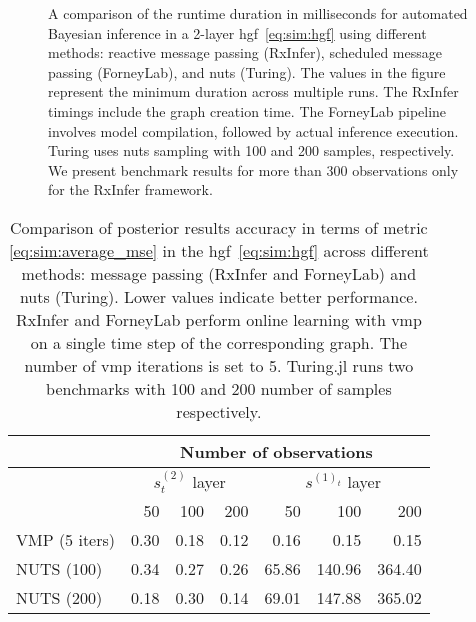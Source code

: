 \begin{figure}
  \centering
  \caption{A comparison of the runtime duration in milliseconds for automated Bayesian inference in a 2-layer \ac{hgf}~\eqref{eq:sim:hgf} using different methods: reactive message passing (RxInfer), scheduled message passing (ForneyLab), and \ac{nuts} (Turing).
    The values in the figure represent the minimum duration across multiple runs.
    The RxInfer timings include the graph creation time.
    The ForneyLab pipeline involves model compilation, followed by actual inference execution.
    Turing uses \ac{nuts} sampling with 100 and 200 samples, respectively.
    We present benchmark results for more than $300$ observations only for the RxInfer framework.
  }
  \label{fig:sim:hgf_performance_comparison}
\end{figure}

\begin{table}[t]
  \centering
  \begin{tabular}{ |l||r|r|r|r|r|r| }
    \hline
                  & \multicolumn{6}{|c|}{Number of observations}                                                                            \\
    \hline
                  & \multicolumn{3}{|c|}{$s^{(2)}_t$ layer}      & \multicolumn{3}{|c|}{$s^{(1)_t}$ layer}                                  \\
    \hline
                  & 50                                           & 100                                     & 200  & 50    & 100    & 200    \\
    \hline
    VMP (5 iters) & 0.30                                         & 0.18                                    & 0.12 & 0.16  & 0.15   & 0.15   \\
    \hline
    NUTS (100)    & 0.34                                         & 0.27                                    & 0.26 & 65.86 & 140.96 & 364.40 \\
    NUTS (200)    & 0.18                                         & 0.30                                    & 0.14 & 69.01 & 147.88 & 365.02 \\
    \hline
  \end{tabular}
  \caption{Comparison of posterior results accuracy in terms of metric \eqref{eq:sim:average_mse} in the \ac{hgf}~\eqref{eq:sim:hgf} across different methods: message passing (RxInfer and ForneyLab) and \ac{nuts} (Turing).
    Lower values indicate better performance.
    RxInfer and ForneyLab perform online learning with \ac{vmp} on a single time step of the
    corresponding graph.
    The number of \ac{vmp} iterations is set to 5.
    Turing.jl runs two benchmarks with 100 and 200 number of samples respectively.
  }
  \label{table:sim:hgf_accuracy_comparison}
\end{table}


